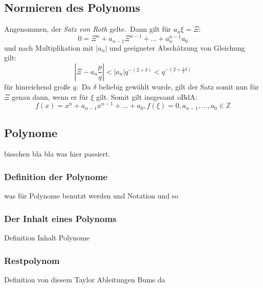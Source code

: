 \documentclass[11pt]{article}
\begin{document}
        \subsection{Normieren des Polynoms}
        \label{subsec:norm-poly}
            \textrm{Angenommen, der \emph{Satz von Roth} gelte.\ Dann gilt für $a_n \xi = \Xi$:}
            \begin{equation*}
                0 = \Xi^n + a_{n-1} \Xi^{n-1} + \dots + a_n^{n-1} a_0
            \end{equation*}
            \textrm{und nach Multiplikation mit $|a_n|$ und geeigneter Abschätzung von Gleichung~ gilt:}
            \begin{equation*}
                | \Xi - a_n \frac{p}{q} | < |a_n| q^{-(2+\delta)} < q^{-(2+\frac{1}{2}\delta)}
            \end{equation*}
            \textrm{für hinreichend große $q$.\ Da $\delta$ beliebig gewählt wurde, gilt der Satz somit nun für $\Xi$
            genau dann, wenn er für $\xi$ gilt. Somit gilt insgesamt oBdA:}
            \begin{equation}
                f(x) = x^n + a_{n-1} x^{n-1} + \dots + a_0 \label{eq:prereq}, f(\xi) = 0, a_{n-1}, \dots, a_0 \in \mathbb{Z}
            \end{equation}

        \subsection{Polynome}
        \label{subsec:polynomials}
            bisschen bla bla was hier passiert.
        
            \subsubsection{Definition der Polynome}
            \label{subsubsec:poly-def}
                \textrm{was für Polynome benutzt werden und Notation und so}
            
            \subsubsection{Der Inhalt eines Polynoms}
            \label{subsubsec:content-poly}
                Definition Inhalt Polynome
            
            \subsubsection{Restpolynom}
            \label{subsubsec:rem-poly}
                Definition von diesem Taylor Ableitungen Bums da
            
\end{document}
